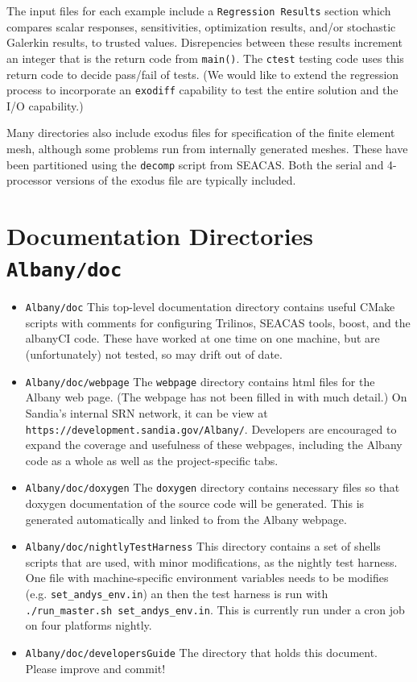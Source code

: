 \documentclass[pdf,12pt,report,strict]{SANDreport}
\theoremstyle{remark}
\begin{document}
The input files for each example include a \texttt{Regression Results} section which 
compares scalar responses, sensitivities, optimization results, and/or stochastic Galerkin
results, to trusted values. Disrepencies between these results increment an integer that
is the return code from \texttt{main()}. The \texttt{ctest} testing code uses this return
code to decide pass/fail of tests. (We would like to extend the regression process to
incorporate an \texttt{exodiff} capability to test the entire solution and the I/O 
capability.)

Many directories also include exodus files for specification of the finite element mesh,
although some problems run from internally generated meshes. These have been partitioned
using the \texttt{decomp} script from SEACAS. Both the serial and 4-processor versions
of the exodus file are typically included.

\section{Documentation Directories \texttt{Albany/doc} }

\begin{itemize}

\item{\texttt{Albany/doc}}  This top-level documentation directory contains
useful CMake scripts with comments for configuring Trilinos, SEACAS tools,
boost, and the albanyCI code. These have worked at one time on one machine,
but are (unfortunately) not tested, so may drift out of date.

\item{\texttt{Albany/doc/webpage}} The \texttt{webpage} directory contains
html files for the Albany web page. (The webpage has not been filled in with 
much detail.) On Sandia's internal SRN network, it can be view at
\texttt{https://development.sandia.gov/Albany/}. Developers are encouraged
to expand the coverage and usefulness of these webpages, including the
Albany code as a whole as well as the project-specific tabs. 

\item{\texttt{Albany/doc/doxygen}} The \texttt{doxygen} directory contains
necessary files so that doxygen documentation of the source code will be
generated. This is generated automatically and linked to from the Albany
webpage. 

\item{\texttt{Albany/doc/nightlyTestHarness}} This directory contains
a set of shells scripts that are used, with minor modifications, as
the nightly test harness. One file with machine-specific environment
variables needs to be modifies (e.g. \texttt{set\_andys\_env.in}) an then
the test harness is run with \texttt{./run\_master.sh set\_andys\_env.in}.
This is currently run under a cron job on four platforms nightly.

\item{\texttt{Albany/doc/developersGuide}} The directory that holds this
document. Please improve and commit!

\end{itemize}
\end{document}
